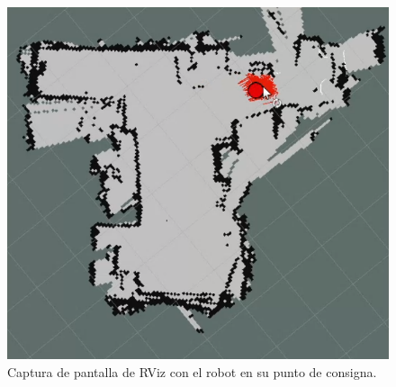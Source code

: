 \begin{figure}[ht]
    \centering
    \includegraphics[scale=0.33]{./Figures/robot_en_setpoint.png}
    \caption{Captura de pantalla de RViz con el robot en su punto de consigna.}
    \label{fig:robotEnSetpoint}
\end{figure}